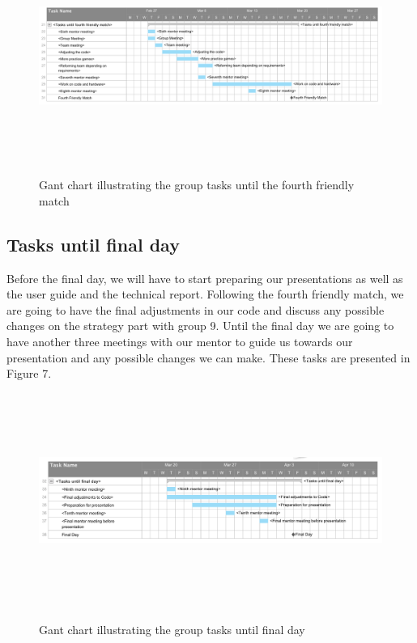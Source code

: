 \documentclass{article}
\begin{document}
\begin{figure}[H]
	\centering
	\begin{minipage}{1\textwidth}
		\centering
		\includegraphics[width=16cm, height=7cm]{FourthFriendlyMatch.png}\\
		\caption{Gant chart illustrating the group tasks until the fourth friendly match}
	\end{minipage}%
\end{figure}

\subsection{Tasks until final day}
Before the final day, we will have to start preparing our presentations as well
as the user guide and the technical report. Following the fourth friendly match,
we are going to have the final adjustments in our code and discuss any possible
changes on the strategy part with group 9. Until the final day we are going to
have another three meetings with our mentor to guide us towards our presentation
and any possible changes we can make. These tasks are presented in Figure 7.
\begin{figure}[H]
	\centering
	\begin{minipage}{1\textwidth}
		\centering
		\includegraphics[width=16cm, height=7cm]{FinalDay.png}\\
		\caption{Gant chart illustrating the group tasks until final day}
	\end{minipage}%
\end{figure}
\end{document}

